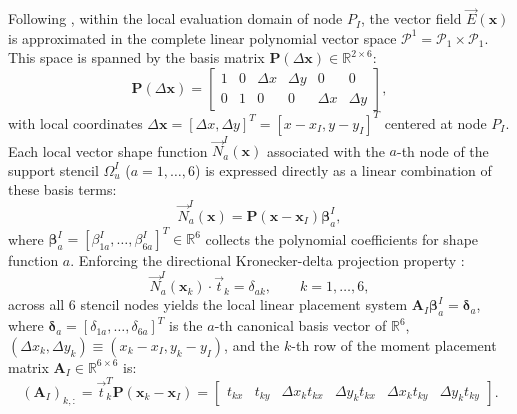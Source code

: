 \documentclass[VANCOUVER,Times1COL]{WileyNJD-v5}
\begin{document}
Following \cite{stable_vnmm2d_2026}, within the local evaluation domain of node $P_I$, the vector field $\vec{E}(\mathbf{x})$ is approximated in the complete linear polynomial vector space $\mathcal{P}^1 = \mathcal{P}_1 \times \mathcal{P}_1$. This space is spanned by the basis matrix $\mathbf{P}(\Delta\mathbf{x}) \in \mathbb{R}^{2 \times 6}$:
\begin{equation}
    \mathbf{P}(\Delta\mathbf{x}) = \begin{bmatrix}
        1 & 0 & \Delta x & \Delta y & 0        & 0        \\
        0 & 1 & 0        & 0        & \Delta x & \Delta y
    \end{bmatrix},
    \label{eq:P_basis_matrix}
\end{equation}
with local coordinates $\Delta\mathbf{x} = [\Delta x, \Delta y]^T = [x - x_I, y - y_I]^T$ centered at node $P_I$.
Each local vector shape function $\vec{N}_a^I(\mathbf{x})$ associated with the $a$-th node of the support stencil $\Omega_u^I$ ($a = 1, \dots, 6$) is expressed directly as a linear combination of these basis terms:
\begin{equation}
    \vec{N}_a^I(\mathbf{x}) = \mathbf{P}(\mathbf{x} - \mathbf{x}_I) \boldsymbol{\beta}_a^I,
    \label{eq:P1_shape_function_expansion_mlpg}
\end{equation}
where $\boldsymbol{\beta}_a^I = [\beta_{1a}^I, \dots, \beta_{6a}^I]^T \in \mathbb{R}^6$ collects the polynomial coefficients for shape function $a$. Enforcing the directional Kronecker-delta projection property \cite{stable_vnmm2d_2026}:
\begin{equation}
    \vec{N}_a^I(\mathbf{x}_k) \cdot \vec{t}_k = \delta_{ak}, \qquad k = 1, \dots, 6,
    \label{eq:kronecker_projection}
\end{equation}
across all 6 stencil nodes yields the local linear placement system $\mathbf{A}_I \boldsymbol{\beta}_a^I = \boldsymbol{\delta}_a$, where $\boldsymbol{\delta}_a = [\delta_{1a}, \dots, \delta_{6a}]^T$ is the $a$-th canonical basis vector of $\mathbb{R}^6$, $(\Delta x_k, \Delta y_k) \equiv (x_k - x_I, y_k - y_I)$, and the $k$-th row of the moment placement matrix $\mathbf{A}_I \in \mathbb{R}^{6 \times 6}$ is:
\begin{equation}
    (\mathbf{A}_I)_{k, :} = \vec{t}_k^T \mathbf{P}(\mathbf{x}_k - \mathbf{x}_I) = \begin{bmatrix} t_{kx} & t_{ky} & \Delta x_k t_{kx} & \Delta y_k t_{kx} & \Delta x_k t_{ky} & \Delta y_k t_{ky} \end{bmatrix}.
    \label{eq:matrix_A_row}
\end{equation}
\end{document}
